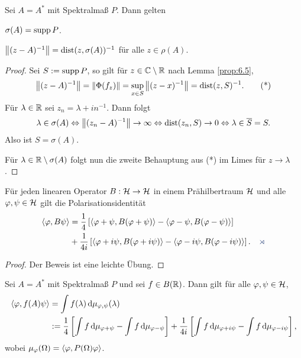 \begin{prop}
\label{prop:6.6}
Sei $A=A^*$ mit Spektralmaß $P$. Dann gelten
\begin{propenum}
\item $\sigma(A) = \operatorname{supp} P$.
\item $\left\|(z-A)^{-1}\right\| = \mathrm{dist}(z,\sigma(A))^{-1}$ für alle
$z\in\rho(A)$.\fishhere
\end{propenum}
\end{prop}
\begin{proof}
Sei $S:=\operatorname{supp} P$, so gilt für $z\in\mathbb{C}\setminus\mathbb{R}$ nach Lemma \ref{prop:6.5},
\begin{align*}
\left\|(z-A)^{-1}\right\| = \left\|\Phi(f_z)\right\| = \sup_{x\in S} \left\|(z-x)^{-1}\right\| =
\mathrm{dist}(z,S)^{-1}.\tag{*}
\end{align*}
Für $\lambda\in\mathbb{R}$ sei $z_n = \lambda + in^{-1}$. Dann folgt
\begin{align*}
\lambda\in\sigma(A) \Leftrightarrow \left\|(z_n-A)^{-1}\right\| \to \infty
\Leftrightarrow \mathrm{dist}(z_n,S) \to 0
\Leftrightarrow \lambda\in \overline{S} = S.
\end{align*}
Also ist $S=\sigma(A)$.

Für $\lambda\in\mathbb{R}\setminus \sigma(A)$ folgt nun die zweite Behauptung aus (*) im
Limes für $z\to \lambda$.\qedhere
\end{proof}

\begin{lem}
\label{prop:6.7}
Für jeden linearen Operator $B: \mathcal{H}\to \mathcal{H}$ in einem Prähilbertraum $\mathcal{H}$ und
alle $\varphi,\psi\in \mathcal{H}$ gilt die Polarisationsidentität
\begin{align*}
\lin{\ph, B\psi} &= \frac{1}{4}\left[\lin{\ph+\psi,B(\ph+\psi)} -
\lin{\ph-\psi,B(\ph-\psi)} \right]\\
&+ \frac{1}{4i}\left[\lin{\ph+i\psi,B(\ph+i\psi)} -
\lin{\ph-i\psi,B(\ph-i\psi)}\right].\fishhere
\end{align*}
\end{lem}
\begin{proof}
Der Beweis ist eine leichte Übung.\qedhere
\end{proof}

\begin{prop}
\label{prop:6.8}
Sei $A=A^*$ mit Spektralmaß $P$ und sei $f\in B(\mathbb{R})$. Dann gilt für alle
$\varphi,\psi\in\mathcal{H}$,
\begin{align*}
\left\langle\varphi,f(A)\psi\right\rangle &= \int f(\lambda) \,\mathrm{d} \mu_{\varphi,\psi}(\lambda)\\
&:= 
\frac{1}{4}\left[\int f \,\mathrm{d} \mu_{\varphi+\psi} - \int f\,\mathrm{d} \mu_{\varphi-\psi} \right]
+ \frac{1}{4i}\left[\int f \,\mathrm{d} \mu_{\varphi+i\psi} - \int f\,\mathrm{d} \mu_{\varphi-i\psi}
\right],
\end{align*}
wobei $\mu_\varphi(\Omega) = \left\langle\varphi,P(\Omega)\varphi\right\rangle$.\fishhere
\end{prop}

